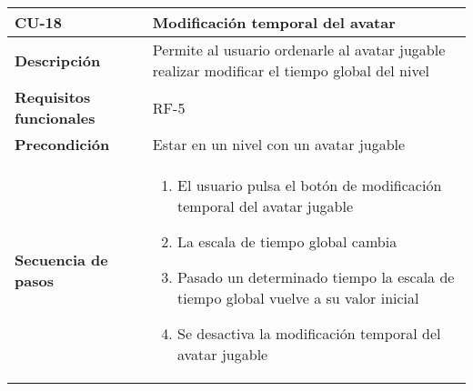 \begin{tabularx}{\columnwidth}{l|l}
\begin{minipage}{0.25\columnwidth}
\textbf{CU-18} 
\end{minipage}
&
\begin{minipage}{0.65\columnwidth}
Modificación temporal del avatar
\end{minipage}
\\ \hline

\begin{minipage}{0.25\columnwidth}
\textbf{Descripción} 
\end{minipage}
&
\begin{minipage}{0.65\columnwidth}
Permite al usuario ordenarle al avatar jugable realizar modificar el tiempo global del nivel
\end{minipage}
\\ \hline

\begin{minipage}{0.25\columnwidth}
\textbf{Requisitos funcionales} 
\end{minipage}
&
\begin{minipage}{0.65\columnwidth}
RF-5
\end{minipage}
\\ \hline

\begin{minipage}{0.25\columnwidth}
\textbf{Precondición} 
\end{minipage}
&
\begin{minipage}{0.65\columnwidth}
Estar en un nivel con un avatar jugable
\end{minipage}
\\ \hline

\begin{minipage}{0.25\columnwidth}
\textbf{Secuencia de pasos} 
\end{minipage}
&
\begin{minipage}{0.65\columnwidth}
\begin{enumerate}
\item
El usuario pulsa el botón de modificación temporal del avatar jugable
\item
La escala de tiempo global cambia
\item
Pasado un determinado tiempo la escala de tiempo global vuelve a su valor inicial
\item
Se desactiva la modificación temporal del avatar jugable
\end{enumerate}
\end{minipage}
\\ \hline


\end{tabularx}
